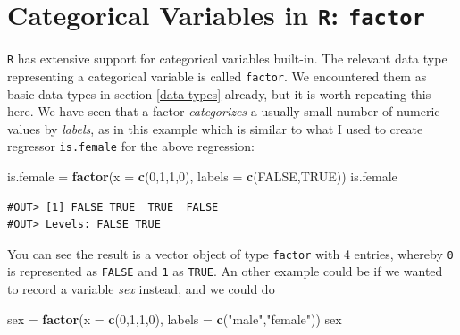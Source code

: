 \documentclass[]{book}
\newenvironment{Shaded}{\begin{snugshade}}{\end{snugshade}}
\newcommand{\KeywordTok}[1]{\textcolor[rgb]{0.13,0.29,0.53}{\textbf{#1}}}
\newcommand{\DataTypeTok}[1]{\textcolor[rgb]{0.13,0.29,0.53}{#1}}
\newcommand{\DecValTok}[1]{\textcolor[rgb]{0.00,0.00,0.81}{#1}}
\newcommand{\StringTok}[1]{\textcolor[rgb]{0.31,0.60,0.02}{#1}}
\newcommand{\OtherTok}[1]{\textcolor[rgb]{0.56,0.35,0.01}{#1}}
\newcommand{\NormalTok}[1]{#1}
\theoremstyle{definition}
\theoremstyle{definition}
\theoremstyle{definition}
\theoremstyle{remark}
\begin{document}
\section{\texorpdfstring{Categorical Variables in \texttt{R}:
\texttt{factor}}{Categorical Variables in R: factor}}\label{categorical-variables-in-r-factor}

\texttt{R} has extensive support for categorical variables built-in. The
relevant data type representing a categorical variable is called
\texttt{factor}. We encountered them as basic data types in section
\ref{data-types} already, but it is worth repeating this here. We have
seen that a factor \emph{categorizes} a usually small number of numeric
values by \emph{labels}, as in this example which is similar to what I
used to create regressor \texttt{is.female} for the above regression:

\begin{Shaded}
\begin{Highlighting}[]
\NormalTok{is.female =}\StringTok{ }\KeywordTok{factor}\NormalTok{(}\DataTypeTok{x =} \KeywordTok{c}\NormalTok{(}\DecValTok{0}\NormalTok{,}\DecValTok{1}\NormalTok{,}\DecValTok{1}\NormalTok{,}\DecValTok{0}\NormalTok{), }\DataTypeTok{labels =} \KeywordTok{c}\NormalTok{(}\OtherTok{FALSE}\NormalTok{,}\OtherTok{TRUE}\NormalTok{))}
\NormalTok{is.female}
\end{Highlighting}
\end{Shaded}

\begin{verbatim}
#OUT> [1] FALSE TRUE  TRUE  FALSE
#OUT> Levels: FALSE TRUE
\end{verbatim}

You can see the result is a vector object of type \texttt{factor} with 4
entries, whereby \texttt{0} is represented as \texttt{FALSE} and
\texttt{1} as \texttt{TRUE}. An other example could be if we wanted to
record a variable \emph{sex} instead, and we could do

\begin{Shaded}
\begin{Highlighting}[]
\NormalTok{sex =}\StringTok{ }\KeywordTok{factor}\NormalTok{(}\DataTypeTok{x =} \KeywordTok{c}\NormalTok{(}\DecValTok{0}\NormalTok{,}\DecValTok{1}\NormalTok{,}\DecValTok{1}\NormalTok{,}\DecValTok{0}\NormalTok{), }\DataTypeTok{labels =} \KeywordTok{c}\NormalTok{(}\StringTok{"male"}\NormalTok{,}\StringTok{"female"}\NormalTok{))}
\NormalTok{sex}
\end{Highlighting}
\end{Shaded}
\end{document}

